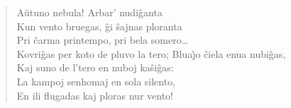 \begin{verse}
                \vin  A\u utuno nebula! Arbar' nudi\^ganta\\
               Kun vento bruegas, \^gi \^sajnas ploranta\\
               Pri \^carma printempo, pri bela somero\dots\\
               Kovri\^gas per koto de pluvo la tero;
\newpage
               Blua\^{\j}o \^ciela enua nubi\^gas,\\
               Kaj suno de l'tero en nuboj ka\^si\^gas:\\
               La kampoj senhomaj en sola silento,\\
               En ili flugadas kaj ploras nur vento!

\end{verse}

\smallrule{}
